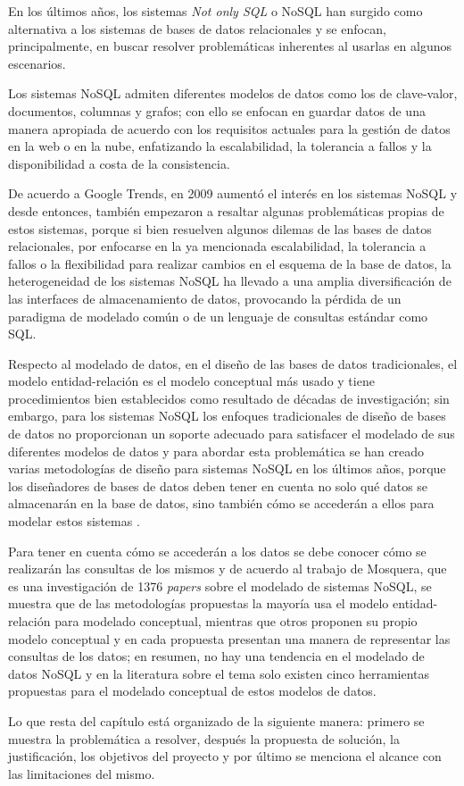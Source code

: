 En los últimos años, los sistemas \textit{Not only SQL} o NoSQL han surgido como alternativa a los sistemas de bases de datos relacionales y se enfocan, principalmente, en buscar resolver problemáticas inherentes al usarlas en algunos escenarios.


Los sistemas NoSQL admiten diferentes modelos de datos como los de clave-valor, documentos, columnas y grafos; con ello se enfocan en guardar datos de una manera apropiada de acuerdo con los requisitos actuales para la gestión de datos en la web o en la nube, enfatizando la escalabilidad, la tolerancia a fallos y la disponibilidad a costa de la consistencia.



De acuerdo a Google Trends\cite{google_google_2020}, en 2009 aumentó el interés en los sistemas NoSQL y desde entonces, también empezaron a resaltar algunas problemáticas propias de estos sistemas, porque si bien resuelven algunos dilemas de las bases de datos relacionales, por enfocarse en la ya mencionada escalabilidad, la tolerancia a fallos o la flexibilidad para realizar cambios en el esquema de la base de datos, la heterogeneidad de los sistemas NoSQL ha llevado a una amplia diversificación de las interfaces de almacenamiento de datos, provocando la pérdida de un paradigma de modelado común o de un lenguaje de consultas estándar como SQL.


Respecto al modelado de datos, en el diseño de las bases de datos tradicionales, el modelo entidad-relación\cite{codd_relational_nodate} es el modelo conceptual más usado y tiene procedimientos bien establecidos como resultado de décadas de investigación; sin embargo, para los sistemas NoSQL los enfoques tradicionales de diseño de bases de datos no proporcionan un soporte adecuado para satisfacer el modelado de sus diferentes modelos de datos y para abordar esta problemática se han creado varias metodologías de diseño para sistemas NoSQL en los últimos años, porque los diseñadores de bases de datos deben tener en cuenta no solo qué datos se almacenarán en la base de datos, sino también cómo se accederán a ellos para modelar estos sistemas \cite{li_transforming_2010,chebotko_big_2015,mior_nose_2017}. 


Para tener en cuenta cómo se accederán a los datos se debe conocer cómo se realizarán las consultas de los mismos y de acuerdo al trabajo de Mosquera\cite{martinez-mosquera_modeling_2020}, que es una investigación de 1376 \textit{papers} sobre el modelado de sistemas NoSQL, se muestra que de las metodologías propuestas la mayoría usa el modelo entidad-relación para modelado conceptual, mientras que otros proponen su propio modelo conceptual y en cada propuesta presentan una manera de representar las consultas de los datos; en resumen, no hay una tendencia en el modelado de datos NoSQL y en la literatura sobre el tema solo existen cinco herramientas propuestas para el modelado conceptual de estos modelos de datos.


Lo que resta del capítulo está organizado de la siguiente manera: primero se muestra la problemática a resolver, después la propuesta de solución, la justificación, los objetivos del proyecto y por último se menciona el alcance con las limitaciones del mismo.